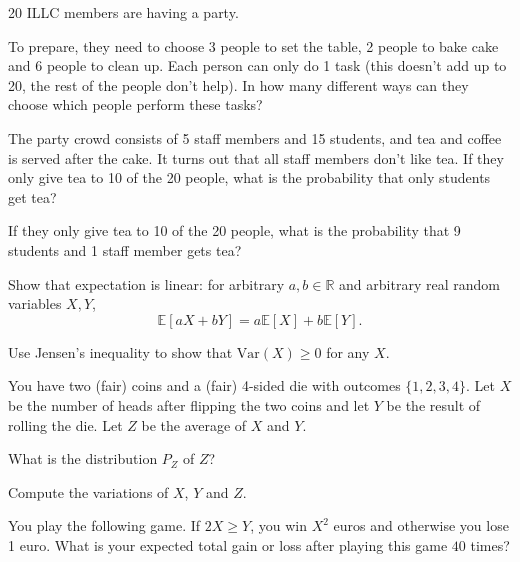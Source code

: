 \documentclass[a4paper,10pt,landscape,twocolumn]{scrartcl}
\begin{document}
\begin{exercise}
 20 ILLC members are having a party.

\begin{subex}[(3pts)]
To prepare, they need to choose 3 people to set the table, 2 people to bake cake and 6 people to clean up. Each person can only do 1 task (this doesn't add up to 20, the rest of the people don't help). In how many different ways can they choose which people perform these tasks?
\end{subex}
\begin{subex}[(3pts)]
The party crowd consists of 5 staff members and 15 students, and tea and coffee is served after the cake. It turns out that all staff members don't like tea. If they only give tea to 10 of the 20 people, what is the probability that only students get tea?
\end{subex}
\begin{subex}[(3pts)]
If they only give tea to 10 of the 20 people, what is the probability that 9 students and 1 staff member gets tea?
\end{subex}
\end{exercise}

\begin{exercise}
	\begin{subex}[(2pt)]
	Show that expectation is linear: for arbitrary $a,b \in \mathbb{R}$ and arbitrary real random variables $X,Y$,
	\[
	\mathbb{E}[aX + bY] = a\mathbb{E}[X] + b \mathbb{E}[Y].
	\]
	\end{subex}
	\begin{subex}[(2pt)]
	Use Jensen's inequality to show that $\mbox{Var}(X) \geq 0$ for any $X$.
	\end{subex}
\end{exercise}


\begin{exercise}
  You have two (fair) coins and a (fair) 4-sided die with outcomes $\{1,2,3,4\}$. Let $X$ be the number of
  heads after flipping the two coins and let $Y$ be the result of rolling the
  die. Let $Z$ be the average of $X$ and $Y$.
\begin{subex}[(2pt)]
What is the distribution $P_Z$ of $Z$?
\end{subex}
  \begin{subex}[(3pt)]
    Compute the variations of $X$, $Y$ and $Z$.	
  \end{subex}
  \begin{subex}[(3pt)]
    You play the following game. If $2X \ge Y$, you win $X^2$ euros and
    otherwise you lose 1 euro. What is your expected total gain or loss after
    playing this game $40$ times?
  \end{subex}
\end{exercise}
\end{document}
